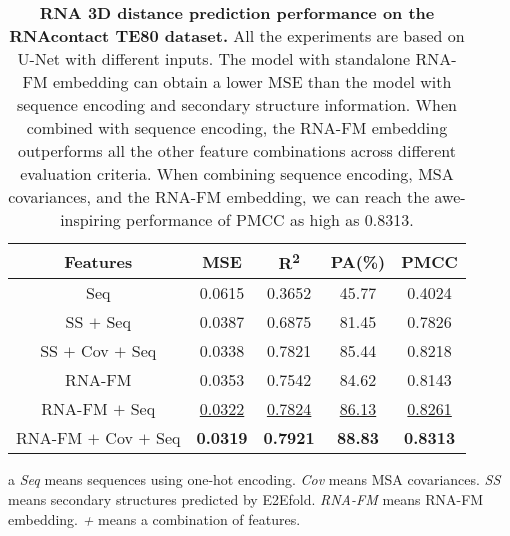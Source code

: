 \begin{table}[!t]
\centering
\caption{\textbf{RNA 3D distance prediction performance on the RNAcontact TE80 dataset.} All the experiments are based on U-Net with different inputs. The model with standalone RNA-FM embedding can obtain a lower MSE than the model with sequence encoding and secondary structure information. When combined with sequence encoding, the RNA-FM embedding outperforms all the other feature combinations across different evaluation criteria. When combining sequence encoding, MSA covariances, and the RNA-FM embedding, we can reach the awe-inspiring performance of PMCC as high as 0.8313.}
\label{table:dist}
\begin{threeparttable}

\begin{tabular}{ccccc} 
\toprule
Features & MSE   & R\textsuperscript{2} & PA(\%)   & PMCC    \\ 
\midrule
Seq\tnote{a}             & 0.0615  & 0.3652  & 45.77  & 0.4024   \\
SS $+$ Seq        & 0.0387  & 0.6875  & 81.45  & 0.7826   \\
SS $+$ Cov $+$ Seq    & 0.0338  & 0.7821  & 85.44  & 0.8218   \\ 
\midrule  %
RNA-FM             & 0.0353  & 0.7542  & 84.62  & 0.8143   \\
RNA-FM $+$ Seq      & \underline{0.0322}  & \underline{0.7824}  & \underline{86.13}  & \underline{0.8261}   \\
RNA-FM $+$ Cov $+$ Seq   & \textbf{0.0319}  &
\textbf{0.7921} & \textbf{88.83}  & \textbf{0.8313}     \\
\bottomrule

\end{tabular}
\begin{tablenotes}
        \footnotesize
        \item[a]\textit{Seq} means sequences using one-hot encoding. \textit{Cov} means MSA covariances. \textit{SS} means secondary structures predicted by E2Efold. \textit{RNA-FM} means RNA-FM embedding. \textit{+} means a combination of features.
      \end{tablenotes}
\end{threeparttable}
\end{table}


